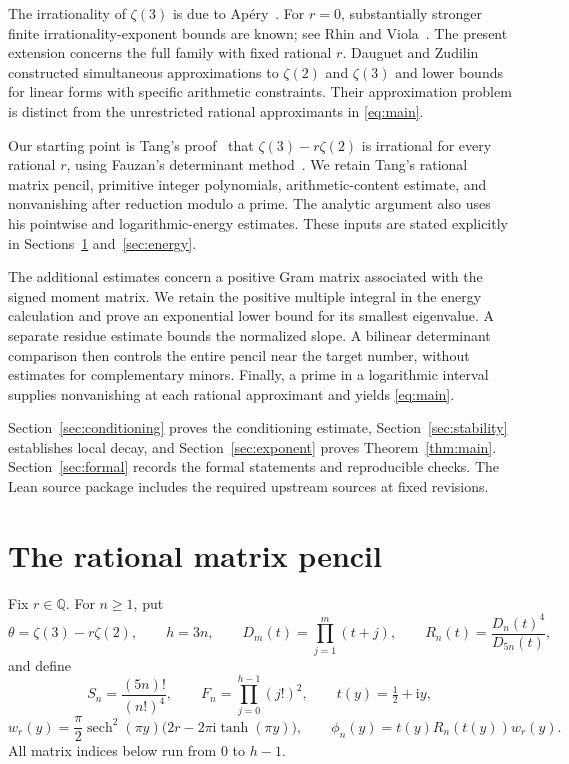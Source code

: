 \documentclass[11pt]{article}
\numberwithin{equation}{section}
\newcommand{\Q}{\mathbb Q}
\newcommand{\ii}{\mathrm i}
\DeclareMathOperator{\sech}{sech}
\begin{document}
The irrationality of $\zeta(3)$ is due to Ap\'ery~\cite{Apery}.
For $r=0$, substantially stronger finite irrationality-exponent bounds
are known; see Rhin and Viola~\cite{RV}. The present extension concerns
the full family with fixed rational $r$.
Dauguet and Zudilin~\cite{DZ} constructed simultaneous approximations to
$\zeta(2)$ and $\zeta(3)$ and lower bounds for linear forms with specific
arithmetic constraints. Their approximation problem is distinct from
the unrestricted rational approximants in \eqref{eq:main}.

Our starting point is Tang's proof~\cite{Tang} that
$\zeta(3)-r\zeta(2)$ is irrational for every rational $r$, using
Fauzan's determinant method~\cite{Fauzan}. We retain Tang's rational
matrix pencil, primitive integer polynomials, arithmetic-content
estimate, and nonvanishing after reduction modulo a prime. The analytic
argument also uses his pointwise and logarithmic-energy estimates.
These inputs are stated explicitly in Sections~\ref{sec:construction}
and~\ref{sec:energy}.

The additional estimates concern a positive Gram matrix associated with
the signed moment matrix. We retain the positive multiple integral in
the energy calculation and prove an exponential lower bound for its
smallest eigenvalue. A separate residue estimate bounds the normalized
slope. A bilinear determinant comparison then controls the entire
pencil near the target number, without estimates for complementary
minors. Finally, a prime in a logarithmic interval supplies nonvanishing
at each rational approximant and yields \eqref{eq:main}.

Section~\ref{sec:conditioning} proves the conditioning estimate,
Section~\ref{sec:stability} establishes local decay, and
Section~\ref{sec:exponent} proves Theorem~\ref{thm:main}.
Section~\ref{sec:formal} records the formal statements and reproducible
checks. The Lean source package includes the required upstream sources
at fixed revisions.

\section{The rational matrix pencil}\label{sec:construction}

Fix $r\in\Q$. For $n\geq1$, put
\[
 \theta=\zeta(3)-r\zeta(2),\qquad h=3n,\qquad
 D_m(t)=\prod_{j=1}^m(t+j),\qquad R_n(t)=\frac{D_n(t)^4}{D_{5n}(t)},
\]
and define
\[
 S_n=\frac{(5n)!}{(n!)^4},\qquad F_n=\prod_{j=0}^{h-1}(j!)^2,
 \qquad t(y)=\tfrac12+\ii y,
\]
\[
 w_r(y)=\frac{\pi}{2}\sech^2(\pi y)
       \bigl(2r-2\pi\ii\tanh(\pi y)\bigr),\qquad
 \phi_n(y)=t(y)R_n(t(y))w_r(y).
\]
All matrix indices below run from $0$ to $h-1$.
\end{document}
